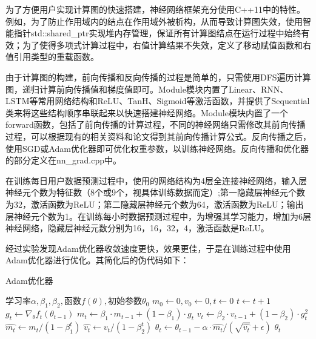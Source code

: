 \documentclass[CJK]{ctexart}
\begin{document}
\begin{enumerate}[(1)]
    \qquad 为了方便用户实现计算图的快速搭建，神经网络框架充分使用C++11中的特性。例如，为了防止作用域内的结点在作用域外被析构，从而导致计算图失效，使用智能指针std::shared\_ptr实现堆内存管理，保证所有计算图结点在运行过程中始终有效；为了使得多项式计算过程中，右值计算结果不失效，定义了移动赋值函数和右值引用类型的重载函数。\par
    \qquad 由于计算图的构建，前向传播和反向传播的过程是简单的，只需使用DFS遍历计算图，递归计算前向传播值和梯度值即可。Module模块内置了Linear、RNN、LSTM等常用网络结构和ReLU、TanH、Sigmoid等激活函数，并提供了Sequential类来将这些结构顺序串联起来以快速搭建神经网络。Module模块内置了一个forward函数，包括了前向传播的计算过程，不同的神经网络只需修改其前向传播过程，可以根据现有的相关资料和论文得到其前向传播计算公式。反向传播之后，使用SGD或Adam优化器即可优化权重参数，以训练神经网络。反向传播和优化器的部分定义在nn\_grad.cpp中。\par
    \qquad 在训练每日用户数据预测过程中，使用的网络结构为4层全连接神经网络，输入层神经元个数为特征数（8个或9个，视具体训练数据而定）;第一隐藏层神经元个数为32，激活函数为ReLU；第二隐藏层神经元个数为64，激活函数为ReLU；输出层神经元个数为1。在训练每小时数据预测过程中，为增强其学习能力，增加为6层神经网络，隐藏层神经元数分别为16，16，32，4，激活函数是ReLU。\par
    \qquad 经过实验发现Adam优化器收敛速度更快，效果更佳，于是在训练过程中使用Adam优化器进行优化。其简化后的伪代码如下：
    \begin{algorithm}
        \caption{Adam优化器}
        \begin{spacing}{1.1}
        \begin{algorithmic}[1]
            \Require $\textbf{学习率}\alpha,\beta_1,\beta_2,\textbf{函数}f(\theta),\textbf{初始参数}\theta_0$
            \State $m_0\leftarrow0,v_0\leftarrow0,t\leftarrow0$
            \State $t\leftarrow t+1$
            \State $g_t\leftarrow \nabla_\theta f_t(\theta_{t-1})$
            \State $m_t\leftarrow \beta_1\cdot m_{t-1}+(1-\beta_1)\cdot g_t$
            \State $v_t\leftarrow \beta_2\cdot v_{t-1}+(1-\beta_2)\cdot g_t^2$
            \State $\hat{m_t}\leftarrow m_t/(1-\beta_1^t)$
            \State $\hat{v_t}\leftarrow v_t/(1-\beta_2^t)$
            \State $\theta_t\leftarrow \theta_{t-1}-\alpha\cdot\hat{m_t}/(\sqrt{\hat{v_t}}+\epsilon)$
            \EndWhile
            \State \Return $\theta_t$
        \end{algorithmic}    
        \end{spacing}
    \end{algorithm}
\end{enumerate}\par
\end{document}
